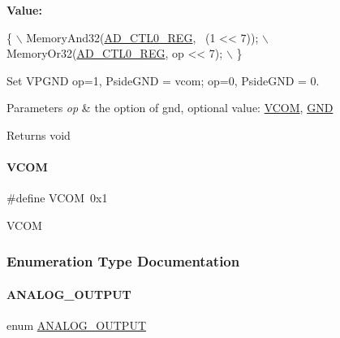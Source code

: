 {\bfseries Value\+:}
\begin{DoxyCode}
\{                                        \(\backslash\)
        MemoryAnd32(\mbox{\hyperlink{a00020_a7c90725a1b307a000a44211bcb115a47}{AD\_CTL0\_REG}}, ~(1 << 7)); \(\backslash\)
        MemoryOr32(\mbox{\hyperlink{a00020_a7c90725a1b307a000a44211bcb115a47}{AD\_CTL0\_REG}}, op << 7);    \(\backslash\)
    \}
\end{DoxyCode}


Set V\+P\+G\+ND op=1, Pside\+G\+ND = vcom; op=0, Pside\+G\+ND = 0. 


\begin{DoxyParams}{Parameters}
{\em op} & the option of gnd, optional value\+: \mbox{\hyperlink{a00002_af5ad26ac9fe7dfd16ab8c8219b24ec93}{V\+C\+OM}}, \mbox{\hyperlink{a00002_a2c058e9d24bb65c1a6ad2d439b2976ab}{G\+ND}} \\
\hline
\end{DoxyParams}
\begin{DoxyReturn}{Returns}
void 
\end{DoxyReturn}
\mbox{\label{a00002_af5ad26ac9fe7dfd16ab8c8219b24ec93}} 
\paragraph{\texorpdfstring{V\+C\+OM}{VCOM}}
{\footnotesize\ttfamily \#define V\+C\+OM~0x1}

V\+C\+OM 

\subsubsection{Enumeration Type Documentation}
\mbox{\label{a00002_a4d490931c48f5330b52533397251335c}} 
\paragraph{\texorpdfstring{A\+N\+A\+L\+O\+G\+\_\+\+O\+U\+T\+P\+UT}{ANALOG\_OUTPUT}}
{\footnotesize\ttfamily enum \mbox{\hyperlink{a00002_a4d490931c48f5330b52533397251335c}{A\+N\+A\+L\+O\+G\+\_\+\+O\+U\+T\+P\+UT}}}

